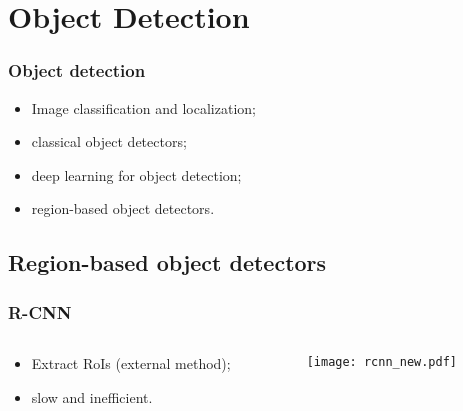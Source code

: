 \documentclass{beamer}
\begin{document}




	\section{Object Detection}

		\begin{frame}\frametitle{Object detection}
			\begin{itemize}
				\item Image classification and localization;
				\item classical object detectors;
				\item deep learning for object detection;
				\item region-based object detectors.
			\end{itemize}
		\end{frame}


		\subsection{Region-based object detectors}

		\begin{frame}\frametitle{R-CNN}
			\begin{columns}
				\begin{column}{0.5\textwidth}
					\begin{itemize}
						\item Extract RoIs (external method);
						\item slow and inefficient.
					\end{itemize}
				\end{column}
				\begin{column}{0.5\textwidth}
					\begin{figure}[th!]
						\centering
						\texttt{[image: rcnn\_new.pdf]}
						\label{fig:R-CNN}
					\end{figure}
				\end{column}
			\end{columns}
		\end{frame}
\end{document}
